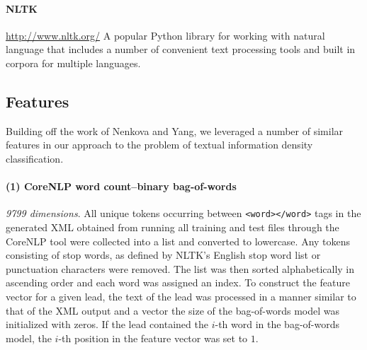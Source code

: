 \documentclass[
10pt, %
a4paper, %
oneside, %
headinclude,footinclude, %
BCOR5mm, %
]{scrartcl}
\begin{document}
\paragraph{\textbf{NLTK}}
\hfill \newline \noindent \url{http://www.nltk.org/} 
\hfill \newline \noindent A popular Python library for working with natural 
language that includes a number of convenient text processing tools and built 
in corpora for multiple languages.


\subsection{Features}

Building off the work of Nenkova and Yang, we leveraged a number of similar 
features in our approach to the problem of textual information density
classification.

\paragraph{\textbf{(1) CoreNLP word count--binary bag-of-words}}
\hfill \newline \noindent \textit{9799 dimensions}. All unique tokens occurring
between \texttt{<word></word>} tags in the generated XML obtained from running
all training and test files through the CoreNLP tool were collected into a list
and converted to lowercase. Any tokens consisting of stop words, as defined by
NLTK's English stop word list or punctuation characters were removed. The list
was then sorted alphabetically in ascending order and each word was assigned an
index. To construct the feature vector for a given lead, the text of the lead
was processed in a manner similar to that of the XML output and a vector the
size of the bag-of-words model was initialized with zeros. If the lead contained
the $i$-th word in the bag-of-words model, the $i$-th position in the feature
vector was set to $1$.

\end{document}
